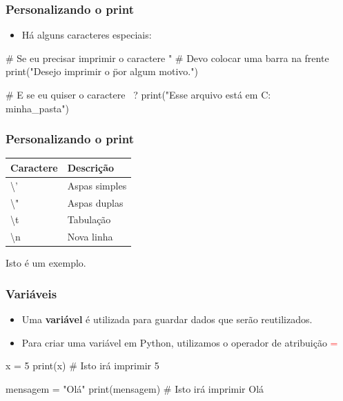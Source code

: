 \documentclass{beamer}
\begin{document}
\begin{frame}[fragile]
  \frametitle{Personalizando o print}

  \begin{itemize}
    \item Há alguns caracteres especiais:
  \end{itemize}

\vfill \begin{python}
# Se eu precisar imprimir o caractere " 
# Devo colocar uma barra na frente
print("Desejo imprimir o \" por algum motivo.")

# E se eu quiser o caractere \ ?
print("Esse arquivo está em C:\\minha_pasta")
\end{python}
\end{frame}

\begin{frame}[fragile]
  \frametitle{Personalizando o print}

  \begin{center}
  \begin{tabular}{l|l}
    Caractere & Descrição \\ \hline
    \textbackslash ' & Aspas simples \\
    \textbackslash " & Aspas duplas \\
    \textbackslash t & Tabulação \\
    \textbackslash n & Nova linha \\
  \end{tabular}
  \end{center}

\vfill {}

\vfill \begin{python}
  Isto
  é
  um
  exemplo.
\end{python}  
\end{frame}

\begin{frame}[fragile]
  \frametitle{Variáveis}

  \begin{itemize}
    \vfill \item Uma \textbf{variável} é utilizada para guardar dados que serão reutilizados. 
    \vfill \item Para criar uma variável em Python, utilizamos o operador de atribuição \textcolor{red}{=} 
  \end{itemize}

\vfill \begin{python}
x = 5
print(x)  # Isto irá imprimir 5

mensagem = "Olá"
print(mensagem) # Isto irá imprimir Olá
\end{python}  
\end{frame}
\end{document}
